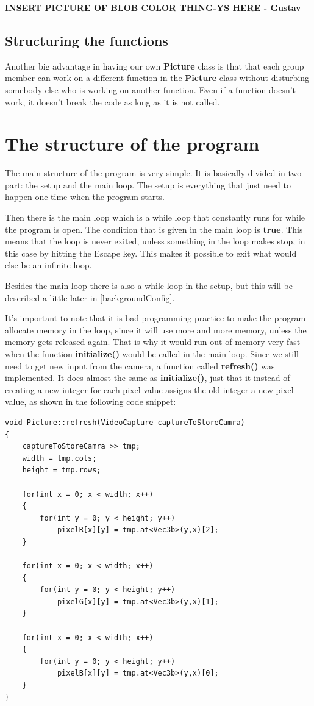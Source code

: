 \textbf{INSERT PICTURE OF BLOB COLOR THING-YS HERE - Gustav} 

\subsection{Structuring the functions}
Another big advantage in having our own \textbf{Picture} class is that that each group member can work on a different function in the \textbf{Picture} class without disturbing somebody else who is working on another function. Even if a function doesn't work, it doesn't break the code as long as it is not called.

\section{The structure of the program}\label{program_structure}
The main structure of the program is very simple. It is basically divided in two part: the setup and the main loop. The setup is everything that just need to happen one time when the program starts.

Then there is the main loop which is a while loop that constantly runs for while the program is open. The condition that is given in the main loop is \textbf{true}. This means that the loop is never exited, unless something in the loop makes stop, in this case by hitting the Escape key. This makes it possible to exit what would else be an infinite loop.

Besides the main loop there is also a while loop in the setup, but this will be described a little later in \ref{backgroundConfig}.

It's important to note that it is bad programming practice to make the program allocate memory in the loop, since it will use more and more memory, unless the memory gets released again. That is why it would run out of memory very fast when the function \textbf{initialize()} would be called in the main loop. Since we still need to get new input from the camera, a function called \textbf{refresh()} was implemented. It does almost the same as \textbf{initialize()}, just that it instead of creating a new integer for each pixel value assigns the old integer a new pixel value, as shown in the following code snippet:

\begin{lstlisting}
void Picture::refresh(VideoCapture captureToStoreCamra)
{
	captureToStoreCamra >> tmp;
	width = tmp.cols;
	height = tmp.rows;

	for(int x = 0; x < width; x++)
	{
		for(int y = 0; y < height; y++)
			pixelR[x][y] = tmp.at<Vec3b>(y,x)[2];
	}

	for(int x = 0; x < width; x++)
	{
		for(int y = 0; y < height; y++)
			pixelG[x][y] = tmp.at<Vec3b>(y,x)[1];
	}

	for(int x = 0; x < width; x++)
	{
		for(int y = 0; y < height; y++)
			pixelB[x][y] = tmp.at<Vec3b>(y,x)[0];
	}
}
\end{lstlisting}

